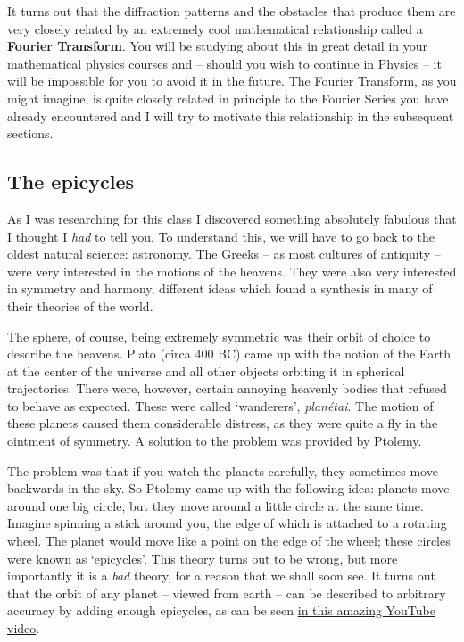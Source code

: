 It turns out that the diffraction patterns and the obstacles that produce them are very closely related by an extremely cool mathematical relationship called a \textbf{Fourier Transform}. You will be studying about this in great detail in your mathematical physics courses and -- should you wish to continue in Physics --  it will be impossible for you to avoid it in the future. The Fourier Transform, as you might imagine, is quite closely related in principle to the Fourier Series you have already encountered and I will try to motivate this relationship in the subsequent sections.

\subsection{The epicycles}

As I was researching for this class I discovered something absolutely fabulous that I thought I \textit{had} to tell you. To understand this, we will have to go back to the oldest natural science: astronomy. The Greeks -- as most cultures of antiquity -- were very interested in the motions of the heavens. They were also very interested in symmetry and harmony, different ideas which found a synthesis in many of their theories of the world. 

The sphere, of course, being extremely symmetric was their orbit of choice to describe the heavens. Plato (circa 400 BC) came up with the notion of the Earth at the center of the universe and all other objects orbiting it in spherical trajectories. There were, however, certain annoying heavenly bodies that refused to behave as expected. These were called `wanderers', \textit{planétai}. The motion of these planets caused them considerable distress, as they were quite a fly in the ointment of symmetry. A solution to the problem was provided by Ptolemy.

The problem was that if you watch the planets carefully, they sometimes move backwards in the sky. So Ptolemy came up with the following idea: planets move around one big circle, but they move around a little circle at the same time. Imagine spinning a stick around you, the edge of which is attached to a rotating wheel. The planet would move like a point on the edge of the wheel; these circles were known as `epicycles'. This theory turns out to be wrong, but more importantly it is a \textit{bad} theory, for a reason that we shall soon see. It turns out that the orbit of any planet -- viewed from earth -- can be described to arbitrary accuracy by adding enough epicycles, as can be seen \href{https://www.youtube.com/watch?v=QVuU2YCwHjw}{in this amazing YouTube video}.

